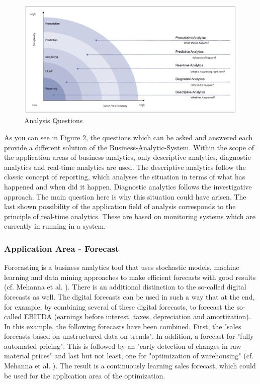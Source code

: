 \documentclass[12pt,twocolumn,twoside]{conference}   %
\begin{document}
\begin{figure}
\centering
\includegraphics[width=16cm]{Abbildungen/Analysis.png}
\caption{Analysis Questions \cite{2}}\label{visina8}
\end{figure}


As you can see in Figure 2, the questions which can be asked and answered  each provide a different solution of the Business-Analytic-System. Within the scope of the application areas of business analytics, only descriptive analytics, diagnostic analytics and real-time analytics are used. The descriptive analytics follow the classic concept of reporting, which analyses the situation in terms of what has happened and when did it happen. Diagnostic analytics follows the investigative approach. The main question here is why this situation could have arisen. The last shown possibility of the application field of analysis corresponds to the principle of real-time analytics. These are based on monitoring systems which are currently in running in a system. 

\subsubsection{Application Area - Forecast}
Forecasting is a business analytics tool that uses stochastic models, machine learning and data mining approaches to make efficient forecasts with good results (cf. Mehanna et al. \cite{2}). There is an additional distinction to the so-called digital forecasts as well. The digital forecasts can be used in such a way that at the end, for example, by combining several of these digital forecasts, to forecast the so-called EBITDA (earnings before interest, taxes, depreciation and amortization). In this example, the following forecasts have been combined. First, the "sales forecasts based on unstructured data on trends". In addition, a forecast for "fully automated pricing". This is followed by an "early detection of changes in raw material prices" and last but not least, one for "optimization of warehousing" (cf. Mehanna et al. \cite{2}). The result is a continuously learning sales forecast, which could be used for the application area of the optimization.
\end{document}
